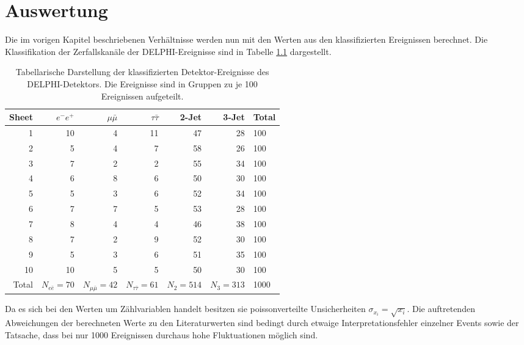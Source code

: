 \documentclass{include/thesisclass3}
\begin{document}
\chapter{Auswertung}
Die im vorigen Kapitel beschriebenen Verhältnisse werden nun mit den Werten aus den klassifizierten Ereignissen berechnet. Die Klassifikation der Zerfallskanäle der DELPHI-Ereignisse sind in Tabelle \ref{rohdaten} dargestellt.
\begin{table}[H]
\begin{center}
\begin{tabular}{   r | r| r | r | r | r | l   }
	Sheet & $e^-e^+$ & $\mu\bar{\mu}$ & $\tau\bar{\tau}$ & 2-Jet & 3-Jet & Total \\\hline
	1 & 10 & 4 & 11 & 47 & 28 & 100 \\ 
	2 & 5 & 4 & 7 & 58 & 26 & 100 \\ 
	3 & 7 & 2 & 2 & 55 & 34 & 100 \\ 
	4 & 6 & 8 & 6 & 50 & 30 & 100 \\ 
	5 & 5 & 3 & 6 & 52 & 34 & 100 \\ 
	6 & 7 & 7 & 5 & 53 & 28 & 100 \\ 
	7 & 8 & 4 & 4 & 46 & 38 & 100 \\ 
	8 & 7 & 2 & 9 & 52 & 30 & 100 \\ 
	9 & 5 & 3 & 6 & 51 & 35 & 100 \\ 
	10 & 10 & 5 & 5 & 50 & 30 & 100 \\ \hline
	Total &$N_{e \bar e} = 70$ & $N_{\mu \bar \mu} = 42$ &$N_{\tau \bar \tau} = 61$ & $N_2 = 514$ & $N_ 3 = 313$ & 1000
\end{tabular}
\end{center}
\caption{\label{rohdaten}Tabellarische Darstellung der klassifizierten Detektor-Ereignisse des DELPHI-Detektors. Die Ereignisse sind in Gruppen zu je 100 Ereignissen aufgeteilt.}
\end{table}
Da es sich bei den Werten um Zählvariablen handelt besitzen sie poissonverteilte Unsicherheiten $\sigma_{x_i}=\sqrt{x_i}$. Die auftretenden Abweichungen der berechneten Werte zu den Literaturwerten sind bedingt durch etwaige Interpretationsfehler einzelner Events sowie der Tatsache, dass bei nur 1000 Ereignissen durchaus hohe Fluktuationen möglich sind.
\end{document}
